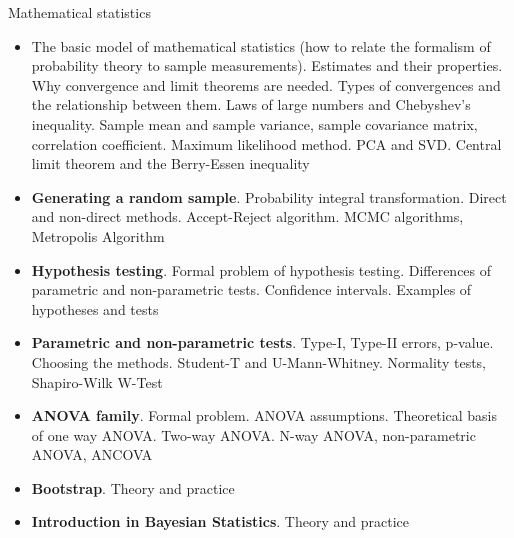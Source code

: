 \documentclass[fullscreen=true, bookmarks=true, hyperref={pdfencoding=unicode}]{beamer}
\begin{document}
\begin{frame}[t]
  Mathematical statistics
  {\scriptsize
  \begin{itemize}
    \item The basic model of mathematical statistics (how to relate the formalism of 
    probability theory to sample measurements). Estimates and their properties. 
    Why convergence and limit theorems are needed. Types of convergences and the relationship between them. 
    Laws of large numbers and Chebyshev's inequality. 
    Sample mean and sample variance, sample covariance matrix, correlation coefficient. 
    Maximum likelihood method. PCA and SVD. Central limit theorem and the Berry-Essen inequality
    \item \textbf{Generating a random sample}. Probability integral transformation. Direct and non-direct methods. 
    Accept-Reject algorithm. MCMC algorithms, Metropolis Algorithm
    \item \textbf{Hypothesis testing}. Formal problem of hypothesis testing. Differences of parametric and non-parametric 
    tests. Confidence intervals. Examples of hypotheses and tests 
    \item \textbf{Parametric and non-parametric tests}. Type-I, Type-II errors, p-value. Choosing the methods. Student-T and U-Mann-Whitney. 
    Normality tests, Shapiro-Wilk W-Test
    \item \textbf{ANOVA family}. Formal problem. ANOVA assumptions. Theoretical basis of one way ANOVA. Two-way ANOVA. 
    N-way ANOVA, non-parametric ANOVA, ANCOVA
    \item \textbf{Bootstrap}. Theory and practice
    \item \textbf{Introduction in Bayesian Statistics}. Theory and practice
  \end{itemize}
  }
\end{frame}
\end{document}
